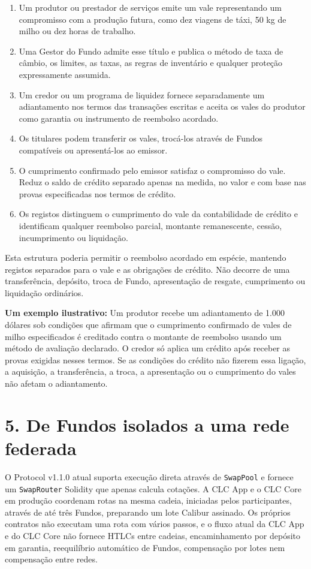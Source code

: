 \documentclass[11pt]{article}
\begin{document}
\begin{enumerate}[leftmargin=*]
\item Um produtor ou prestador de serviços emite um vale representando um compromisso com a produção futura, como dez viagens de táxi, 50 kg de milho ou dez horas de trabalho.
\item Uma Gestor do Fundo admite esse título e publica o método de taxa de câmbio, os limites, as taxas, as regras de inventário e qualquer proteção expressamente assumida.
\item Um credor ou um programa de liquidez fornece separadamente um adiantamento nos termos das transações escritas e aceita os vales do produtor como garantia ou instrumento de reembolso acordado.
\item Os titulares podem transferir os vales, trocá-los através de Fundos compatíveis ou apresentá-los ao emissor.
\item O cumprimento confirmado pelo emissor satisfaz o compromisso do vale. Reduz o saldo de crédito separado apenas na medida, no valor e com base nas provas especificadas nos termos de crédito.
\item Os registos distinguem o cumprimento do vale da contabilidade de crédito e identificam qualquer reembolso parcial, montante remanescente, cessão, incumprimento ou liquidação.
\end{enumerate}
Esta estrutura poderia permitir o reembolso acordado em espécie, mantendo registos separados para o vale e as obrigações de crédito. Não decorre de uma transferência, depósito, troca de Fundo, apresentação de resgate, cumprimento ou liquidação ordinários.

\textbf{Um exemplo ilustrativo:} Um produtor recebe um adiantamento de 1.000 dólares sob condições que afirmam que o cumprimento confirmado de vales de milho especificados é creditado contra o montante de reembolso usando um método de avaliação declarado. O credor só aplica um crédito após receber as provas exigidas nesses termos. Se as condições do crédito não fizerem essa ligação, a aquisição, a transferência, a troca, a apresentação ou o cumprimento do vales não afetam o adiantamento.


\section*{5. De Fundos isolados a uma rede federada}

O Protocol v1.1.0 atual suporta execução direta através de \texttt{SwapPool} e fornece um \texttt{SwapRouter} Solidity que apenas calcula cotações. A CLC App e o CLC Core em produção coordenam rotas na mesma cadeia, iniciadas pelos participantes, através de até três Fundos, preparando um lote Calibur assinado. Os próprios contratos não executam uma rota com vários passos, e o fluxo atual da CLC App e do CLC Core não fornece HTLCs entre cadeias, encaminhamento por depósito em garantia, reequilíbrio automático de Fundos, compensação por lotes nem compensação entre redes.
\end{document}
